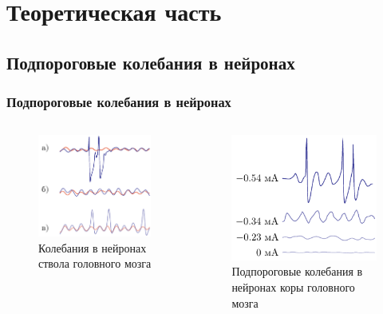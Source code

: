 \section{Теоретическая часть}
\subsection{Подпороговые колебания в нейронах}
\begin{frame}[c]
	\frametitle{Подпороговые колебания в нейронах}
	\begin{columns}
		\begin{column}{0.49\textwidth}
			\begin{figure}[h]
				\centering
				\includegraphics[]{img/img_1a}
				\caption[]{Колебания в нейронах ствола головного мозга}
			\end{figure}
		\end{column}
		\begin{column}{0.49\textwidth}
			\begin{figure}[h]
				\centering
				\includegraphics[]{img/img_1d}	
				\caption[]{Подпороговые колебания в нейронах коры головного мозга}
			\end{figure}
		\end{column}
	\end{columns}
\end{frame}
